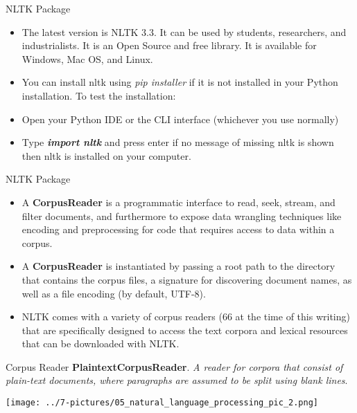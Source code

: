 \documentclass[11pt]{beamer}
\begin{document}
\begin{frame}{NLTK Package}
	\begin{itemize}
		\item The latest version is NLTK 3.3. It can be used by students, researchers, and industrialists. It is an Open Source and free library. It is available for Windows, Mac OS, and Linux. 
		\item You can install nltk using \textit{pip installer} if it is not installed in your Python installation. To test the installation:
		\item Open your Python IDE or the CLI interface (whichever you use normally)
		\item Type \textbf{\textit{import nltk}} and press enter if no message of missing nltk is shown then nltk is installed on your computer.
	\end{itemize}
\end{frame}
\begin{frame}{NLTK Package}
	\begin{itemize}
		\item A \textbf{CorpusReader} is a programmatic interface to read, seek, stream, and filter documents, and furthermore to expose data wrangling techniques like encoding and preprocessing for code that requires access to data within a corpus. 
		\item A \textbf{CorpusReader} is instantiated by passing a root path to the directory that contains the corpus files, a signature for discovering document names, as well as a file encoding (by default, UTF-8).
		\item NLTK comes with a variety of corpus readers (66 at the time of this writing) that are specifically designed to access the text corpora and lexical resources that can be downloaded with NLTK.
	\end{itemize}
\end{frame}
\begin{frame}{Corpus Reader}
	\textbf{PlaintextCorpusReader}. \textit{A reader for corpora that consist of plain-text documents, where paragraphs are assumed to be split using blank lines}.
	\begin{center}
	\texttt{[image: ../7-pictures/05\_natural\_language\_processing\_pic\_2.png]}
	\end{center}
\end{frame}
\end{document}
